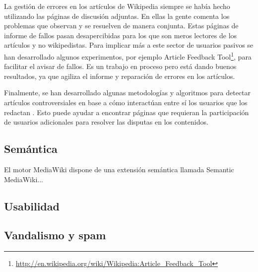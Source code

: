 \documentclass[11pt,onecolumn]{article}
\begin{document}

La gestión de errores en los artículos de Wikipedia siempre se había hecho utilizando las páginas de discusión adjuntas. En ellas la gente comenta los problemas que observan y se resuelven de manera conjunta. Estas páginas de informe de fallos pasan desapercibidas para los que son meros lectores de los artículos y no wikipedistas. Para implicar más a este sector de usuarios pasivos se han desarrollado algunos experimentos, por ejemplo Article Feedback Tool\footnote{\href{http://en.wikipedia.org/wiki/Wikipedia:Article_Feedback_Tool}{http://en.wikipedia.org/wiki/Wikipedia:Article\_Feedback\_Tool}}, para facilitar el avisar de fallos. Es un trabajo en proceso pero está dando buenos resultados, ya que agiliza el informe y reparación de errores en los artículos.


Finalmente, se han desarrollado algunas metodologías y algoritmos para detectar artículos controversiales en base a cómo interactúan entre sí los usuarios que los redactan \citep{sepehrirad2012}. Esto puede ayudar a encontrar páginas que requieran la participación de usuarios adicionales para resolver las disputas en los contenidos.

\subsection{Semántica}


El motor MediaWiki dispone de una extensión semántica llamada Semantic MediaWiki...



\subsection{Usabilidad}



%

\subsection{Vandalismo y spam}

\end{document}
